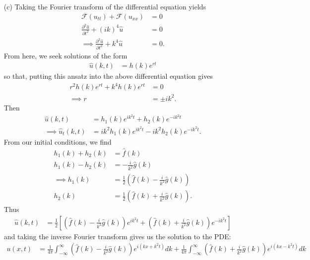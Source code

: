 \documentclass{article}
\begin{document}
\begin{itemize}
\begin{itemize}
        \item[(c)] Taking the Fourier transform of the differential equation yields
        \begin{align*}
            \mathcal{F}(u_{tt}) + \mathcal{F}(u_{xx}) &= 0\\
            \frac{\partial^2\hat{u}}{\partial t^2} + (ik)^4\hat{u} &= 0\\
            \implies\frac{\partial^2\hat{u}}{\partial t^2} + k^4\hat{u} &= 0.
        \end{align*}
        From here, we seek solutions of the form
        \begin{align*}
            \hat{u}(k,t) &= h(k)e^{rt}
        \end{align*}
        so that, putting this ansatz into the above differential equation gives
        \begin{align*}
            r^2h(k)e^{rt} + k^4h(k)e^{rt} &= 0\\
            \implies r &= \pm ik^2.
        \end{align*}
        Then 
        \begin{align*}
            \hat{u}(k,t) &= h_1(k)e^{ik^2t} + h_2(k)e^{-ik^2t}\\
            \implies \hat{u}_t(k,t) &= ik^2h_1(k)e^{ik^2t} - ik^2h_2(k)e^{-ik^2t}.
        \end{align*}
        From our initial conditions, we find
        \begin{align*}
            h_1(k) + h_2(k) &= \hat{f}(k)\\
            h_1(k) - h_2(k) &= -\frac{i}{k^2}\hat{g}(k)\\
            \implies h_1(k) &=\frac{1}{2}\left(\hat{f}(k) - \frac{i}{k^2}\hat{g}(k)\right)\\
            h_2(k) &= \frac{1}{2}\left(\hat{f}(k) + \frac{i}{k^2}\hat{g}(k)\right).
        \end{align*}
        Thus
        \begin{align*}
            \hat{u}(k,t) &= \frac{1}{2}\left[\left(\hat{f}(k) - \frac{i}{k^2}\hat{g}(k)\right)e^{ik^2t} + \left(\hat{f}(k) + \frac{i}{k^2}\hat{g}(k)\right)e^{-ik^2t}\right]
        \end{align*}
        and taking the inverse Fourier transform gives us the solution to the PDE:
        \begin{align*}
            u(x,t) &= \frac{1}{4\pi}\int_{-\infty}^{\infty}\left(\hat{f}(k) - \frac{i}{k^2}\hat{g}(k)\right)e^{i(kx + k^2t)}dk + \frac{1}{4\pi}\int_{-\infty}^{\infty}\left(\hat{f}(k) + \frac{i}{k^2}\hat{g}(k)\right)e^{i(kx - k^2t)}dk
        \end{align*}


\end{itemize}
\end{itemize}
\end{document}
